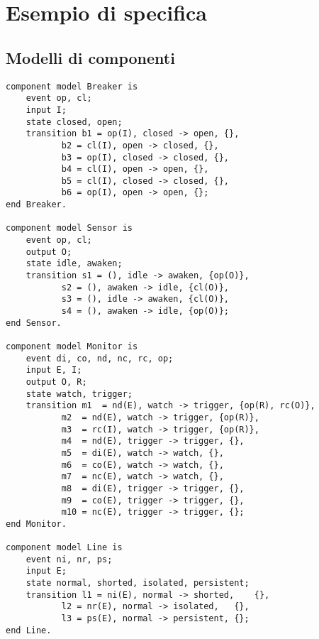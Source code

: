 \chapter{Esempio di specifica}
\section{Modelli di componenti}
\begin{verbatim}
component model Breaker is
	event op, cl;
	input I;
	state closed, open;
	transition b1 = op(I), closed -> open, {},
		   b2 = cl(I), open -> closed, {},
	 	   b3 = op(I), closed -> closed, {},
		   b4 = cl(I), open -> open, {},
		   b5 = cl(I), closed -> closed, {},
		   b6 = op(I), open -> open, {};
end Breaker.

component model Sensor is
	event op, cl;
	output O;
	state idle, awaken;
	transition s1 = (), idle -> awaken, {op(O)},
		   s2 = (), awaken -> idle, {cl(O)},
		   s3 = (), idle -> awaken, {cl(O)},
		   s4 = (), awaken -> idle, {op(O)};
end Sensor.

component model Monitor is
	event di, co, nd, nc, rc, op;
	input E, I;	
	output O, R;
	state watch, trigger;
	transition m1  = nd(E), watch -> trigger, {op(R), rc(O)},
		   m2  = nd(E), watch -> trigger, {op(R)},
		   m3  = rc(I), watch -> trigger, {op(R)},
		   m4  = nd(E), trigger -> trigger, {},
		   m5  = di(E), watch -> watch, {},
		   m6  = co(E), watch -> watch, {},
		   m7  = nc(E), watch -> watch, {},
		   m8  = di(E), trigger -> trigger, {},
		   m9  = co(E), trigger -> trigger, {},
		   m10 = nc(E), trigger -> trigger, {};
end Monitor.

component model Line is
	event ni, nr, ps;
	input E;
	state normal, shorted, isolated, persistent;
	transition l1 = ni(E), normal -> shorted,    {},
		   l2 = nr(E), normal -> isolated,   {},
		   l3 = ps(E), normal -> persistent, {};
end Line.
\end{verbatim}

